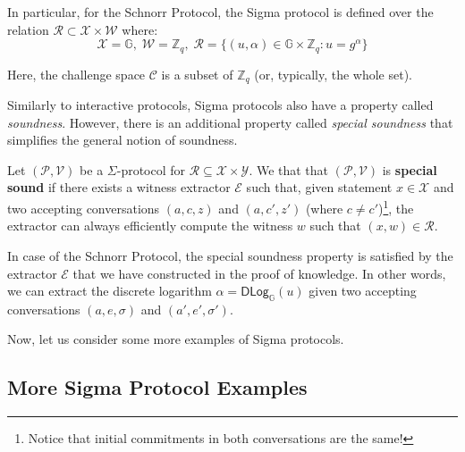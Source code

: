 \documentclass[../../book.tex]{subfiles}
\begin{document}
\vspace{-5mm}

\begin{example}
    In particular, for the Schnorr Protocol, the Sigma protocol is defined over the relation $\mathcal{R} \subset \mathcal{X} \times \mathcal{W}$ where:
    \begin{equation*}
        \mathcal{X} = \mathbb{G},\; \mathcal{W} = \mathbb{Z}_q, \; \mathcal{R} = \{(u,\alpha) \in \mathbb{G} \times \mathbb{Z}_q: u = g^{\alpha}\}
    \end{equation*}

    Here, the challenge space $\mathcal{C}$ is a subset of $\mathbb{Z}_q$ (or, typically, the whole set).
\end{example}

\vspace{-1mm}

Similarly to interactive protocols, Sigma protocols also have a property called \textit{soundness}. However, there is an additional property called \textit{special soundness} that simplifies the general notion of soundness.

\vspace{-1mm}

\begin{definition}
    Let $(\mathcal{P}, \mathcal{V})$ be a $\Sigma$-protocol for $\mathcal{R} \subseteq \mathcal{X} \times \mathcal{Y}$. We that that $(\mathcal{P},\mathcal{V})$ is \textbf{special sound} if there exists a witness extractor $\mathcal{E}$ such that, given statement $x \in \mathcal{X}$ and two accepting conversations $(a,c,z)$ and $(a,c',z')$ (where $c \neq c'$)\footnote{Notice that initial commitments in both conversations are the same!}, the extractor can always efficiently compute the witness $w$ such that $(x,w) \in \mathcal{R}$.
\end{definition}

\begin{example}
    In case of the Schnorr Protocol, the special soundness property is satisfied by the extractor $\mathcal{E}$ that we have constructed in the proof of knowledge. In other words, we can extract the discrete logarithm $\alpha = \mathsf{DLog}_{\mathbb{G}}(u)$ given two accepting conversations $(a,e,\sigma)$ and $(a',e',\sigma')$.
\end{example}

Now, let us consider some more examples of Sigma protocols.

\subsection{More Sigma Protocol Examples}
\end{document}
